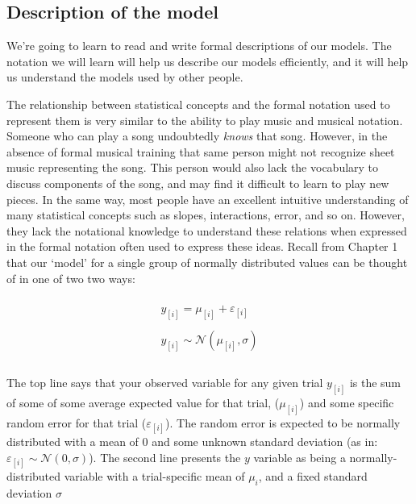 \documentclass[
]{book}
\begin{document}
\hypertarget{description-of-the-model}{%
\subsection{Description of the model}\label{description-of-the-model}}

We're going to learn to read and write formal descriptions of our models. The notation we will learn will help us describe our models efficiently, and it will help us understand the models used by other people.

The relationship between statistical concepts and the formal notation used to represent them is very similar to the ability to play music and musical notation. Someone who can play a song undoubtedly \emph{knows} that song. However, in the absence of formal musical training that same person might not recognize sheet music representing the song. This person would also lack the vocabulary to discuss components of the song, and may find it difficult to learn to play new pieces. In the same way, most people have an excellent intuitive understanding of many statistical concepts such as slopes, interactions, error, and so on. However, they lack the notational knowledge to understand these relations when expressed in the formal notation often used to express these ideas.
Recall from Chapter 1 that our `model' for a single group of normally distributed values can be thought of in one of two two ways:

\begin{equation}
\begin{split}
\\
y_{[i]} = \mu_{[i]} + \varepsilon_{[i]} \\ \\
y_{[i]} \sim \mathcal{N}(\mu_{[i]},\sigma) \\ \\
\end{split}
\label{eq:21}
\end{equation}

The top line says that your observed variable for any given trial \(y_{[i]}\) is the sum of some of some average expected value for that trial, (\(\mu_{[i]}\)) and some specific random error for that trial (\(\varepsilon_{[i]}\)). The random error is expected to be normally distributed with a mean of 0 and some unknown standard deviation (as in: \(\varepsilon_{[i]} \sim \mathcal{N}(0,\sigma)\)). The second line presents the \(y\) variable as being a normally-distributed variable with a trial-specific mean of \(\mu_i\), and a fixed standard deviation \(\sigma\)
\end{document}
